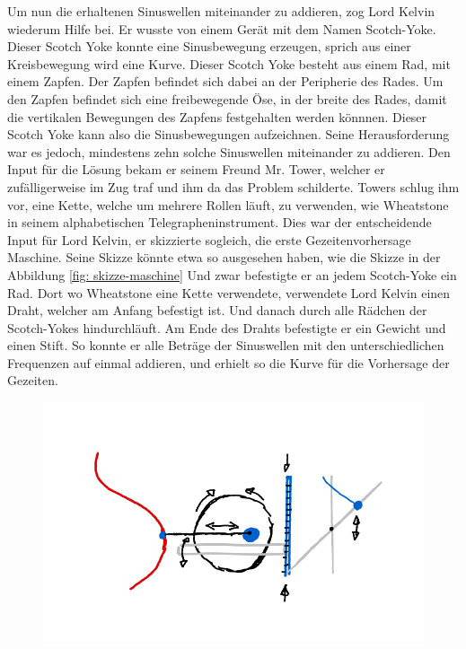Um nun die erhaltenen Sinuswellen miteinander zu addieren, zog Lord Kelvin wiederum Hilfe bei.
Er wusste von einem Gerät mit dem Namen Scotch-Yoke.
Dieser Scotch Yoke konnte eine Sinusbewegung erzeugen, sprich aus einer Kreisbewegung wird eine Kurve.
Dieser Scotch Yoke besteht aus einem Rad, mit einem Zapfen.
Der Zapfen befindet sich dabei an der Peripherie des Rades.
Um den Zapfen befindet sich eine freibewegende Öse, in der breite des Rades, damit die vertikalen Bewegungen des Zapfens festgehalten werden könnnen.
Dieser Scotch Yoke kann also die Sinusbewegungen aufzeichnen.
Seine Herausforderung war es jedoch, mindestens zehn solche Sinuswellen miteinander zu addieren.
Den Input für die Lösung bekam er seinem Freund Mr. Tower, welcher er zufälligerweise im Zug traf und ihm da das Problem schilderte.
Towers schlug ihm vor, eine Kette, welche um mehrere Rollen läuft, zu verwenden, wie Wheatstone in seinem alphabetischen Telegrapheninstrument.
Dies war der entscheidende Input für Lord Kelvin, er skizzierte sogleich, die erste Gezeitenvorhersage Maschine. Seine Skizze könnte etwa so ausgesehen haben, wie die Skizze in der Abbildung \ref{fig: skizze-maschine}
Und zwar befestigte er an jedem Scotch-Yoke ein Rad.
Dort wo Wheatstone eine Kette verwendete, verwendete Lord Kelvin einen Draht, welcher am Anfang befestigt ist.
Und danach durch alle Rädchen der Scotch-Yokes hindurchläuft.
Am Ende des Drahts befestigte er ein Gewicht und einen Stift.
So konnte er alle Beträge der Sinuswellen mit den unterschiedlichen Frequenzen auf einmal addieren, und erhielt so die Kurve für die Vorhersage der Gezeiten.

\begin{figure}
	\centering
	\includegraphics[width=\linewidth]{"papers/gezeiten/Skizze Integralmaschine"}
	\caption{}
	\label{fig:skizze-maschine}
\end{figure}

